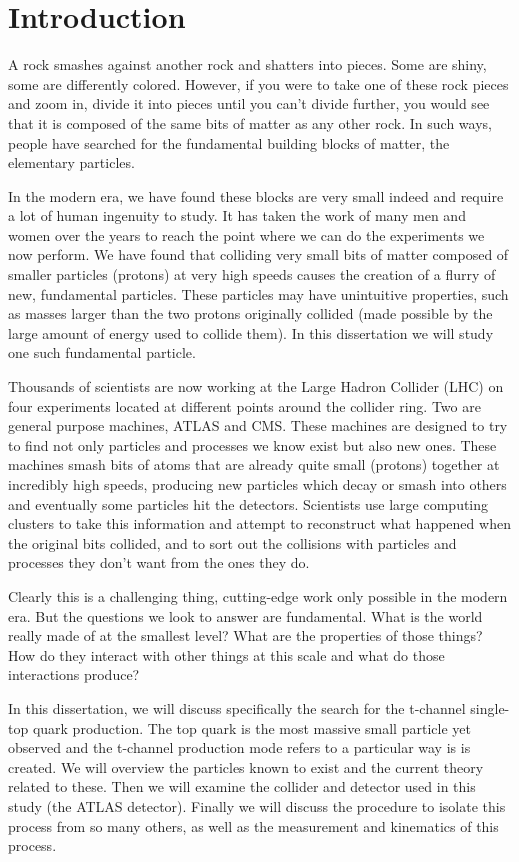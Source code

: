 \chapter{Introduction}
A rock smashes against another rock and shatters into pieces.  Some are shiny, some are differently colored.  However, if you were to take one of these rock pieces and zoom in, divide it into pieces until you can't divide further, you would see that it is composed of the same bits of matter as any other rock.  In such ways, people have searched for the fundamental building blocks of matter, the elementary particles.  

In the modern era, we have found these blocks are very small indeed and require a lot of human ingenuity to study.  It has taken the work of many men and women over the years to reach the point where we can do the experiments we now perform.  We have found that colliding very small bits of matter composed of smaller particles (protons) at very high speeds causes the creation of a flurry of new, fundamental particles.  These particles may have unintuitive properties, such as masses larger than the two protons originally collided (made possible by the large amount of energy used to collide them).  In this dissertation we will study one such fundamental particle.

Thousands of scientists are now working at the Large Hadron Collider (LHC) on four experiments located at different points around the collider ring.  Two are general purpose machines, ATLAS and CMS.  These machines are designed to try to find not only particles and processes we know exist but also new ones.  These machines smash bits of atoms that are already quite small (protons) together at incredibly high speeds, producing new particles which decay or smash into others and eventually some particles hit the detectors.  Scientists use large computing clusters to take this information and attempt to reconstruct what happened when the original bits collided, and to sort out the collisions with particles and processes they don't want from the ones they do.  

Clearly this is a challenging thing, cutting-edge work only possible in the modern era.  But the questions we look to answer are fundamental.  What is the world really made of at the smallest level?  What are the properties of those things?  How do they interact with other things at this scale and what do those interactions produce?  

In this dissertation, we will discuss specifically the search for the t-channel single-top quark production.  The top quark is the most massive small particle yet observed and the t-channel production mode refers to a particular way is is created.  We will overview the particles known to exist and the current theory related to these.  Then we will examine the collider and detector used in this study (the ATLAS detector).  Finally we will discuss the procedure to isolate this process from so many others, as well as the measurement and kinematics of this process.

